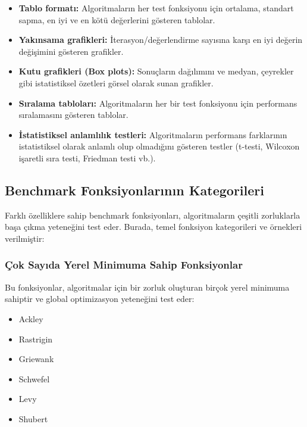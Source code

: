 \begin{itemize}
    \item \textbf{Tablo formatı:} Algoritmaların her test fonksiyonu için ortalama, standart sapma, en iyi ve en kötü değerlerini gösteren tablolar.
    
    \item \textbf{Yakınsama grafikleri:} İterasyon/değerlendirme sayısına karşı en iyi değerin değişimini gösteren grafikler.
    
    \item \textbf{Kutu grafikleri (Box plots):} Sonuçların dağılımını ve medyan, çeyrekler gibi istatistiksel özetleri görsel olarak sunan grafikler.
    
    \item \textbf{Sıralama tabloları:} Algoritmaların her bir test fonksiyonu için performans sıralamasını gösteren tablolar.
    
    \item \textbf{İstatistiksel anlamlılık testleri:} Algoritmaların performans farklarının istatistiksel olarak anlamlı olup olmadığını gösteren testler (t-testi, Wilcoxon işaretli sıra testi, Friedman testi vb.).
\end{itemize}

\subsection{Benchmark Fonksiyonlarının Kategorileri}

Farklı özelliklere sahip benchmark fonksiyonları, algoritmaların çeşitli zorluklarla başa çıkma yeteneğini test eder. Burada, temel fonksiyon kategorileri ve örnekleri verilmiştir:

\subsubsection{Çok Sayıda Yerel Minimuma Sahip Fonksiyonlar}

Bu fonksiyonlar, algoritmalar için bir zorluk oluşturan birçok yerel minimuma sahiptir ve global optimizasyon yeteneğini test eder:

\begin{itemize}
    \item Ackley
    \item Rastrigin
    \item Griewank
    \item Schwefel
    \item Levy
    \item Shubert
\end{itemize}

